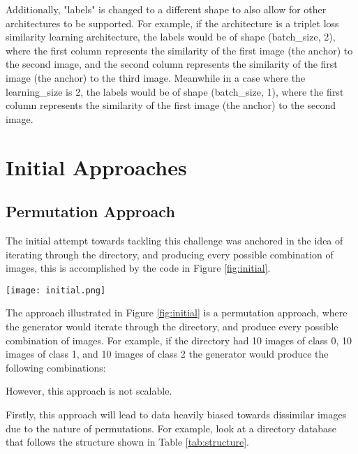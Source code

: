 \documentclass[
	letterpaper, %
	10pt, %
	unnumberedsections, %
	twoside, %
]{LTJournalArticle}
\begin{document}
Additionally, "labels" is changed to a different shape to also allow for other architectures to be supported. For example, if the architecture is a triplet loss similarity learning architecture, the labels would be of shape (batch\_size, 2), where the first column represents the similarity of the first image (the anchor) to the second image, and the second column represents the similarity of the first image (the anchor) to the third image. Meanwhile in a case where the learning\_size is 2, the labels would be of shape (batch\_size, 1), where the first column represents the similarity of the first image (the anchor) to the second image.

\section{Initial Approaches}

\subsection{Permutation Approach}
The initial attempt towards tackling this challenge was anchored in the idea of iterating through the directory, and producing every possible combination of images, this is accomplished by the code in Figure \ref{fig:initial}.

\begin{figure*} %
	\texttt{[image: initial.png]}
	\caption{The initial Python code for developing a generator for Siamese Neural Networks.}
	\label{fig:initial}
\end{figure*}

The approach illustrated in Figure \ref{fig:initial} is a permutation approach, where the generator would iterate through the directory, and produce every possible combination of images. For example, if the directory had 10 images of class 0, 10 images of class 1, and 10 images of class 2 the generator would produce the following combinations:


However, this approach is not scalable. %

Firstly, this approach will lead to data heavily biased towards dissimilar images due to the nature of permutations. For example, look at a directory database that follows the structure shown in Table \ref{tab:structure}.
\end{document}
